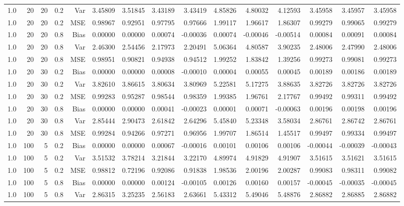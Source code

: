 \begin{table}[!htbp]
\begin{tabular}{lrrrrrrrrrrrrrr}
1.0 &  20 & 20 & 0.2 & Var & 3.45809 & 3.51845 & 3.43189 & 3.43419 & 4.85826 & 4.80032 & 4.12593 & 3.45958 & 3.45957 & 3.45958 \\
1.0 &  20 & 20 & 0.2 & MSE & 0.98967 & 0.92951 & 0.97795 & 0.97666 & 1.99117 & 1.96617 & 1.86307 & 0.99279 & 0.99065 & 0.99279 \\
1.0 &  20 & 20 & 0.8 & Bias & 0.00000 & 0.00000 & 0.00074 & -0.00036 & 0.00074 & -0.00046 & -0.00514 & 0.00084 & 0.00091 & 0.00084 \\
1.0 &  20 & 20 & 0.8 & Var & 2.46300 & 2.54456 & 2.17973 & 2.20491 & 5.06364 & 4.80587 & 3.90235 & 2.48006 & 2.47990 & 2.48006 \\
1.0 &  20 & 20 & 0.8 & MSE & 0.98951 & 0.90821 & 0.94938 & 0.94512 & 1.99252 & 1.83842 & 1.39256 & 0.99273 & 0.99081 & 0.99273 \\
1.0 &  20 & 30 & 0.2 & Bias & 0.00000 & 0.00000 & 0.00008 & -0.00010 & 0.00004 & 0.00055 & 0.00045 & 0.00189 & 0.00186 & 0.00189 \\
1.0 &  20 & 30 & 0.2 & Var & 3.82610 & 3.86615 & 3.80634 & 3.80969 & 5.22581 & 5.17275 & 3.88635 & 3.82726 & 3.82726 & 3.82726 \\
1.0 &  20 & 30 & 0.2 & MSE & 0.99283 & 0.95287 & 0.98544 & 0.98359 & 1.99385 & 1.96761 & 2.17767 & 0.99492 & 0.99311 & 0.99492 \\
1.0 &  20 & 30 & 0.8 & Bias & 0.00000 & 0.00000 & 0.00041 & -0.00023 & 0.00001 & 0.00071 & -0.00063 & 0.00196 & 0.00198 & 0.00196 \\
1.0 &  20 & 30 & 0.8 & Var & 2.85444 & 2.90473 & 2.61842 & 2.64296 & 5.45840 & 5.23348 & 3.58034 & 2.86761 & 2.86742 & 2.86761 \\
1.0 &  20 & 30 & 0.8 & MSE & 0.99284 & 0.94266 & 0.97271 & 0.96956 & 1.99707 & 1.86514 & 1.45517 & 0.99497 & 0.99334 & 0.99497 \\
1.0 & 100 &  5 & 0.2 & Bias & 0.00000 & 0.00000 & 0.00067 & -0.00016 & 0.00101 & 0.00106 & 0.00106 & -0.00044 & -0.00039 & -0.00043 \\
1.0 & 100 &  5 & 0.2 & Var & 3.51532 & 3.78214 & 3.21844 & 3.22170 & 4.89974 & 4.91829 & 4.91907 & 3.51615 & 3.51621 & 3.51615 \\
1.0 & 100 &  5 & 0.2 & MSE & 0.98812 & 0.72196 & 0.92086 & 0.91838 & 1.98536 & 2.00196 & 2.00287 & 0.99083 & 0.98311 & 0.99082 \\
1.0 & 100 &  5 & 0.8 & Bias & 0.00000 & 0.00000 & 0.00124 & -0.00105 & 0.00126 & 0.00160 & 0.00157 & -0.00045 & -0.00035 & -0.00045 \\
1.0 & 100 &  5 & 0.8 & Var & 2.86315 & 3.25235 & 2.56183 & 2.63661 & 5.43312 & 5.49046 & 5.48876 & 2.86882 & 2.86885 & 2.86882 \\

\end{tabular}
\end{table}
